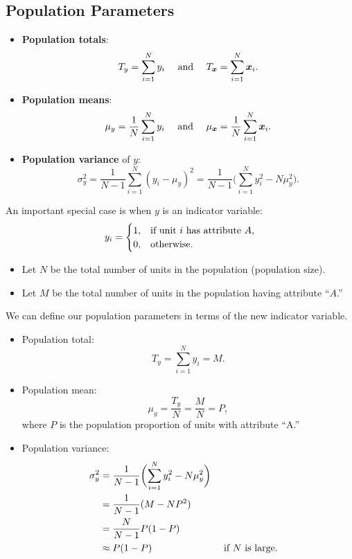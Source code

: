 \subsection*{Population Parameters}
\begin{Regular}{}
      \begin{itemize}
            \item \textbf{Population totals}:
                  \[ T_y=\sum_{i=1}^{N}y_i\quad\text{ and }\quad T_{\bm{x}}=\sum_{i=1}^{N}\bm{x}_i. \]
            \item \textbf{Population means}:
                  \[ \mu_y=\frac{1}{N}\sum_{i=1}^{N}y_i\quad\text{ and }\quad \mu_{\bm{x}}=\frac{1}{N}\sum_{i=1}^{N}\bm{x}_i. \]
            \item \textbf{Population variance} of $ y $:
                  \[ \sigma_y^2=\frac{1}{N-1}\sum_{i=1}^{N}(y_i-\mu_y)^2
                        =\frac{1}{N-1}\biggl(\sum_{i=1}^{N}y_i^2-N\mu_y^2\biggr). \]
      \end{itemize}
\end{Regular}
\begin{Regular}{}
      An important special case is when $y$ is an indicator variable:
      \[ y_i=\begin{cases}
                  1, & \text{if unit $ i $ has attribute $A$}, \\
                  0, & \text{otherwise}.
            \end{cases} \]
      \begin{itemize}
            \item Let $ N $ be the total number of units in the population (population size).
            \item Let $ M $ be the total number of units in the population having attribute ``$A$.''
      \end{itemize}
      \tcblower{}
      We can define our population parameters in terms of the new indicator variable.
      \begin{itemize}
            \item Population total:
                  \[ T_y=\sum_{i=1}^{N}y_i=M. \]
            \item Population mean:
                  \[ \mu_y=\frac{T_y}{N}=\frac{M}{N}=P, \]
                  where $ P $ is the population proportion of units with attribute ``A.''
            \item Population variance:
                  \begin{align*}
                        \sigma_y^2
                         & =\frac{1}{N-1}\biggl(\sum_{i=1}^{N}y_i^2-N\mu_y^2\biggr)                                 \\
                         & =\frac{1}{N-1}(M-NP^2)                                                                   \\
                         & =\frac{N}{N-1}P(1-P)                                                                     \\
                         & \approx P(1-P)                                           &  & \text{ if $ N $ is large}.
                  \end{align*}
      \end{itemize}
\end{Regular}
